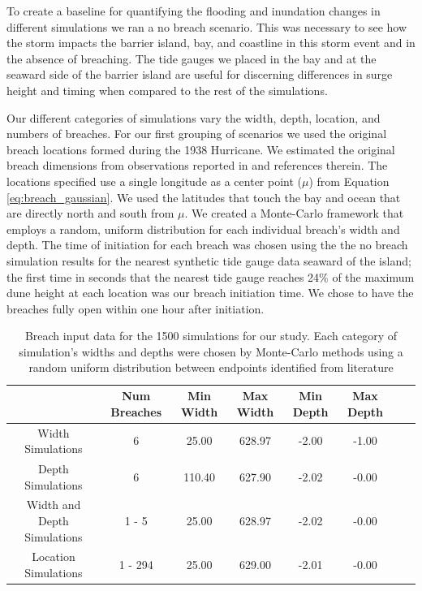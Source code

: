 \documentclass{coastal_paper}
\begin{document}
To create a baseline for quantifying the flooding and inundation changes in different simulations we ran a no breach scenario. This was necessary to see how the storm impacts the barrier island, bay, and coastline in this storm event and in the absence of breaching. The tide gauges we placed in the bay and at the seaward side of the barrier island are useful for discerning differences in surge height and timing when compared to the rest of the simulations.

Our different categories of simulations vary the width, depth, location, and numbers of breaches. For our first grouping of scenarios we used the original breach locations formed during the 1938 Hurricane. We estimated the original breach dimensions from observations reported in \citet{canizares2008simulation} and references therein. The locations specified use a single longitude as a center point ($\mu$) from Equation \ref{eq:breach_gaussian}. We used the latitudes that touch the bay and ocean that are directly north and south from $\mu$. We created a Monte-Carlo framework that employs a random, uniform distribution for each individual breach's width and depth. The time of initiation for each breach was chosen using the the no breach simulation results for the nearest synthetic tide gauge data seaward of the island; the first time in seconds that the nearest tide gauge reaches 24\% of the maximum dune height at each location was our breach initiation time. We chose to have the breaches fully open within one hour after initiation.

\begin{table}
\caption{Breach input data for the 1500 simulations for our study. Each category of simulation's widths and depths were chosen by Monte-Carlo methods using a random uniform distribution between endpoints identified from literature}
\begin{tabular}{cccccccc}
\toprule
{} & Num Breaches & Min Width & Max Width & Min Depth & Max Depth \\
\midrule
Width Simulations         &            6 &     25.00 &    628.97 &     -2.00 &     -1.00 \\
Depth Simulations         &            6 &    110.40 &    627.90 &     -2.02 &     -0.00 \\
Width and Depth Simulations &        1 - 5 &     25.00 &    628.97 &     -2.02 &     -0.00 \\
Location Simulations    &      1 - 294 &     25.00 &    629.00 &     -2.01 &     -0.00 \\
\bottomrule
\end{tabular}

\label{table:1}
\end{table}
\end{document}

